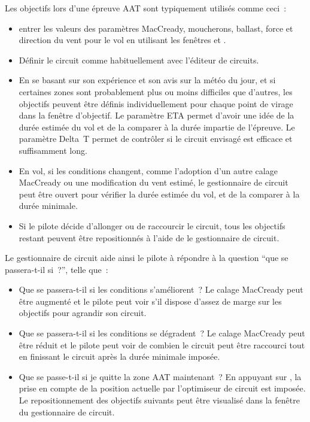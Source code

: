 Les objectifs lors d'une épreuve AAT sont typiquement utilisés comme ceci~:
\begin{itemize}
\item entrer les valeurs des paramètres MacCready, moucherons, ballast, force et direction du vent pour le vol en utilisant les fenêtres  et .
\item Définir le circuit comme habituellement avec l'éditeur de circuits.
\item En se basant sur son expérience et son avis sur la météo du jour,
et si certaines zones sont probablement plus ou moins difficiles que
d'autres, les objectifs peuvent être définis individuellement pour chaque point de virage
dans la fenêtre d'objectif. Le paramètre ETA permet d'avoir une idée de la durée estimée du vol et de la comparer à
la durée impartie de l'épreuve. Le paramètre Delta~T permet de contrôler si le circuit
envisagé est efficace et suffisamment long.
\item En vol, si les conditions changent, comme l'adoption d'un autre calage MacCready ou une modification du vent estimé,
le gestionnaire de circuit peut être ouvert pour vérifier la durée estimée du vol, et de la comparer à la durée minimale.
\item Si le pilote décide d'allonger ou de raccourcir le circuit, tous les objectifs
restant peuvent être repositionnés à l'aide de le gestionnaire de circuit.
\end{itemize}

Le gestionnaire de circuit aide ainsi le pilote à répondre à la
question ``que se passera-t-il si~?'', telle que~:
\begin{itemize}
\item Que se passera-t-il si les conditions s'améliorent~? Le calage MacCready peut être
augmenté et le pilote peut voir s'il dispose d'assez de marge sur les objectifs pour
agrandir son circuit. 
\item Que se passera-t-il si les conditions se dégradent~? Le calage MacCready peut être
réduit et le pilote peut voir de combien le circuit peut être raccourci tout en
finissant le circuit après la durée minimale imposée.
\item Que se passe-t-il si je quitte la zone AAT maintenant~? En appuyant sur , la prise en compte de la position actuelle par l'optimiseur de circuit est imposée. Le repositionnement des objectifs suivants peut être visualisé dans la fenêtre du gestionnaire de circuit.
\end{itemize}

